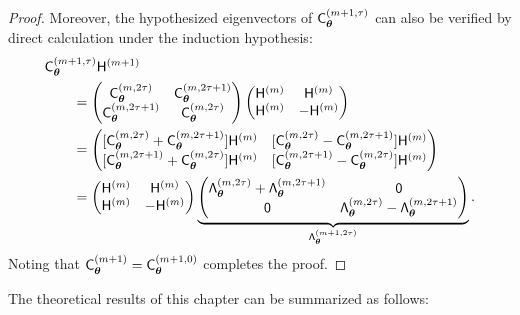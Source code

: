 \documentclass[graybox,footinfo]{svmult}
\begin{document}
\begin{proof}
    Moreover, the hypothesized eigenvectors of $\mathsf{C}_{{\boldsymbol{\theta}}}^{(m+1,\tau)}$ can also be verified by direct calculation under the induction hypothesis:
     \begin{align*}
        \MoveEqLeft{\mathsf{C}_{\bstheta}^{(m+1,\tau)} \mathsf{H}^{(m+1)}} \\
        & =  
        \begin{pmatrix} \mathsf{C}_{\bstheta}^{(m,2 \tau)} & \mathsf{C}_{\bstheta}^{(m,2 \tau+1)} \\
        \mathsf{C}_{\bstheta}^{(m,2 \tau+1)} & \mathsf{C}_{\bstheta}^{(m,2 \tau)}
        \end{pmatrix} 
        \begin{pmatrix}
        \mathsf{H}^{(m)} &   \mathsf{H}^{(m)} \\
         \mathsf{H}^{(m)} & - \mathsf{H}^{(m)}
        \end{pmatrix}\\
        & = 
    \begin{pmatrix}
        [\mathsf{C}_{\bstheta}^{(m,2\tau)} + \mathsf{C}_{\bstheta}^{(m,2\tau+1)}] \mathsf{H}^{(m)} & [\mathsf{C}_{\bstheta}^{(m,2\tau)} - \mathsf{C}_{\bstheta}^{(m,2\tau+1)}] \mathsf{H}^{(m)}\\
        [\mathsf{C}_{\bstheta}^{(m,2\tau+1)} + \mathsf{C}_{\bstheta}^{(m,2\tau)}] \mathsf{H}^{(m)} &   [\mathsf{C}_{\bstheta}^{(m,2\tau+1)} - \mathsf{C}_{\bstheta}^{(m,2\tau)}] \mathsf{H}^{(m)}
        \end{pmatrix} \\
        & = \begin{pmatrix}
        \mathsf{H}^{(m)} & \mathsf{H}^{(m)} \\ \mathsf{H}^{(m)} & -\mathsf{H}^{(m)}
        \end{pmatrix} 
        \underbrace{\begin{pmatrix}
        \mathsf{\Lambda}_\bstheta^{(m,2\tau)} + \mathsf{\Lambda}_\bstheta^{(m,2\tau+1)}  & \mathsf{0}\\
        \mathsf{0} &   \mathsf{\Lambda}_\bstheta^{(m,2\tau)} - \mathsf{\Lambda}_\bstheta^{(m,2\tau+1)}
        \end{pmatrix}}_{\mathsf{\Lambda}_\bstheta^{(m+1,2\tau)}} 
        .
    \end{align*}
Noting that $\mathsf{C}_{\boldsymbol{\theta}}^{(m+1)} = \mathsf{C}_{\boldsymbol{\theta}}^{(m+1,0)} $ completes the proof.
\end{proof}


The theoretical results of this chapter can be summarized as follows:
\end{document}
